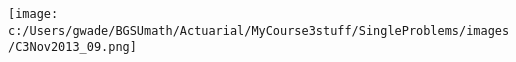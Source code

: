
\texttt{[image: c:/Users/gwade/BGSUmath/Actuarial/MyCourse3stuff/SingleProblems/images/C3Nov2013\_09.png]}

\showsol{\bsoln

\esoln}
